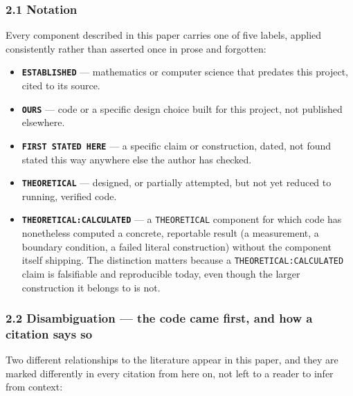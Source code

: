 \documentclass[
  10pt,
]{article}
\providecommand{\tightlist}{%
  \setlength{\itemsep}{0pt}\setlength{\parskip}{0pt}}
\begin{document}
\hypertarget{notation}{%
\subsubsection{2.1 Notation}\label{notation}}

Every component described in this paper carries one of five labels,
applied consistently rather than asserted once in prose and forgotten:

\begin{itemize}
\tightlist
\item
  \textbf{\texttt{ESTABLISHED}} --- mathematics or computer science that
  predates this project, cited to its source.
\item
  \textbf{\texttt{OURS}} --- code or a specific design choice built for
  this project, not published elsewhere.
\item
  \textbf{\texttt{FIRST\ STATED\ HERE}} --- a specific claim or
  construction, dated, not found stated this way anywhere else the
  author has checked.
\item
  \textbf{\texttt{THEORETICAL}} --- designed, or partially attempted,
  but not yet reduced to running, verified code.
\item
  \textbf{\texttt{THEORETICAL:CALCULATED}} --- a \texttt{THEORETICAL}
  component for which code has nonetheless computed a concrete,
  reportable result (a measurement, a boundary condition, a failed
  literal construction) without the component itself shipping. The
  distinction matters because a \texttt{THEORETICAL:CALCULATED} claim is
  falsifiable and reproducible today, even though the larger
  construction it belongs to is not.
\end{itemize}

\hypertarget{disambiguation-the-code-came-first-and-how-a-citation-says-so}{%
\subsubsection{2.2 Disambiguation --- the code came first, and how a
citation says
so}\label{disambiguation-the-code-came-first-and-how-a-citation-says-so}}

Two different relationships to the literature appear in this paper, and
they are marked differently in every citation from here on, not left to
a reader to infer from context:
\end{document}
